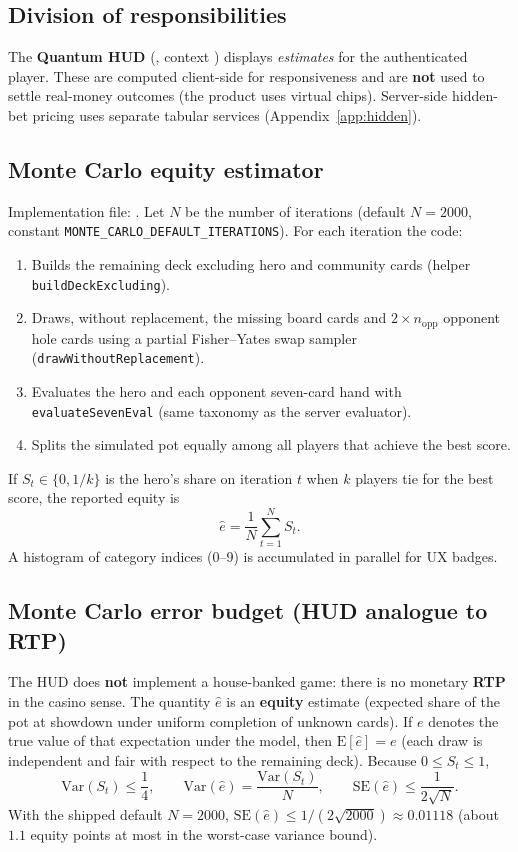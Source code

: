 \documentclass[11pt,a4paper]{article}
\begin{document}
\subsection{Division of responsibilities}

The \textbf{Quantum HUD} (, context ) displays \textit{estimates} for the authenticated player. These are computed client-side for responsiveness and are \textbf{not} used to settle real-money outcomes (the product uses virtual chips). Server-side hidden-bet pricing uses separate tabular services (Appendix~\ref{app:hidden}).

\subsection{Monte Carlo equity estimator}

Implementation file: . Let $N$ be the number of iterations (default $N=2000$, constant \texttt{MONTE\_CARLO\_DEFAULT\_ITERATIONS}). For each iteration the code:
\begin{enumerate}
\item Builds the remaining deck excluding hero and community cards (helper \texttt{buildDeckExcluding}).
\item Draws, without replacement, the missing board cards and $2\times n_{\mathrm{opp}}$ opponent hole cards using a partial Fisher--Yates swap sampler (\texttt{drawWithoutReplacement}).
\item Evaluates the hero and each opponent seven-card hand with \texttt{evaluateSevenEval} (same taxonomy as the server evaluator).
\item Splits the simulated pot equally among all players that achieve the best score.
\end{enumerate}
If $S_t \in \{0, 1/k\}$ is the hero's share on iteration $t$ when $k$ players tie for the best score, the reported equity is
\[
\hat{e} = \frac{1}{N}\sum_{t=1}^{N} S_t .
\]
A histogram of category indices (0--9) is accumulated in parallel for UX badges.

\subsection{Monte Carlo error budget (HUD analogue to RTP)}

The HUD does \textbf{not} implement a house-banked game: there is no monetary \textbf{RTP} in the casino sense. The quantity $\hat{e}$ is an \textbf{equity} estimate (expected share of the pot at showdown under uniform completion of unknown cards). If $e$ denotes the true value of that expectation under the model, then $\mathrm{E}[\hat{e}]=e$ (each draw is independent and fair with respect to the remaining deck). Because $0\le S_t\le 1$,
\[
\mathrm{Var}(S_t)\le \frac{1}{4},
\qquad
\mathrm{Var}(\hat{e})=\frac{\mathrm{Var}(S_t)}{N},
\qquad
\mathrm{SE}(\hat{e})\le \frac{1}{2\sqrt{N}}.
\]
With the shipped default $N=2000$, $\mathrm{SE}(\hat{e})\le 1/(2\sqrt{2000})\approx 0.01118$ (about $1.1$ equity points at most in the worst-case variance bound).
\end{document}
